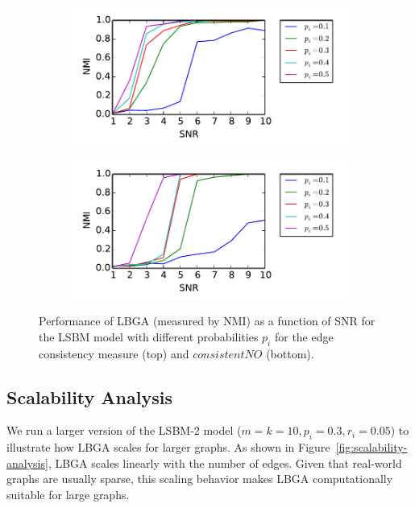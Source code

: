 \documentclass{article}
\begin{document}
\begin{figure}[bht]

\begin{subfigure}{0.01\columnwidth}
     \includegraphics[scale=0.7]{signal-to-noise-ECC.pdf}
\end{subfigure}    

\begin{subfigure}{0.01\columnwidth}
    \includegraphics[scale=0.7]{signal-to-noise-consistentNO.pdf}
\end{subfigure}

\caption{Performance of LBGA (measured by NMI) as a function of SNR for the
LSBM model with different probabilities $p_i$ for the edge consistency measure
(top) and $consistentNO$ (bottom).} 
\label{fig:sensitivity-analysis}
\end{figure}

\subsection{Scalability Analysis}
\label{sec:scalability-analysis}

We run a larger version of the LSBM-2 model ($m=k=10,p_i=0.3,r_i=0.05$) to
illustrate how LBGA scales for larger graphs. As shown in
Figure~\ref{fig:scalability-analysis}, LBGA scales linearly with the number of
edges. Given that real-world graphs are usually sparse, this scaling behavior
makes LBGA computationally suitable for large graphs.
\end{document}
